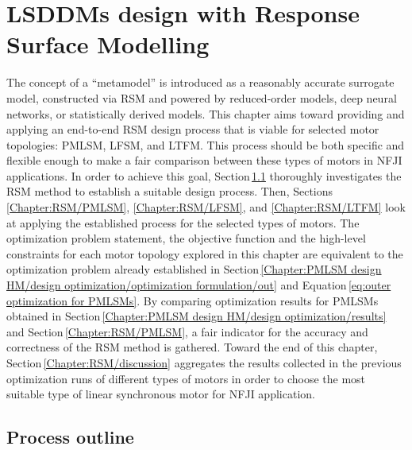 \chapter{\acsp{LSDDM} design with Response Surface Modelling}   \label{Chapter:PMLSM design RSM}


    The concept of a “metamodel” is introduced as a reasonably accurate surrogate model, constructed via \acf{RSM} and powered by reduced-order models, deep neural networks, or statistically derived models. This chapter aims toward providing and applying an end-to-end \acs{RSM} design process that is viable for selected motor topologies: \acf{PMLSM}, \acf{LFSM}, and \acf{LTFM}. This process should be both specific and flexible enough to make a fair comparison between these types of motors in \acs{NFJI} applications. In order to achieve this goal, Section\,\ref{Chapter:RSM/outline} thoroughly investigates the \acs{RSM} method to establish a suitable design process. Then, Sections\,\ref{Chapter:RSM/PMLSM}, \ref{Chapter:RSM/LFSM}, and \ref{Chapter:RSM/LTFM} look at applying the established process for the selected types of motors. The optimization problem statement, the objective function and the high-level constraints for each motor topology explored in this chapter are equivalent to the optimization problem already established in Section\,\ref{Chapter:PMLSM design HM/design optimization/optimization formulation/out} and Equation\,\ref{eq:outer optimization for PMLSMs}. By comparing optimization results for \acsp{PMLSM} obtained in Section\,\ref{Chapter:PMLSM design HM/design optimization/results} and Section\,\ref{Chapter:RSM/PMLSM}, a fair indicator for the accuracy and correctness of the \ac{RSM} method is gathered. Toward the end of this chapter, Section\,\ref{Chapter:RSM/discussion} aggregates the results collected in the previous optimization runs of different types of motors in order to choose the most suitable type of linear synchronous motor for \acs{NFJI} application.


    \section{Process outline}                        \label{Chapter:RSM/outline}
    
